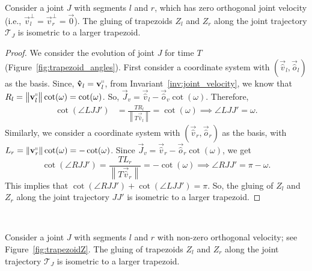 \begin{lemma}
\label{lem:trapezoid_gluing_parallel}
Consider a joint $J$ with segments $l$ and $r$,
which has zero orthogonal joint velocity (i.e., $\vec v_l^\perp = \vec v_r^\perp = \vec 0$).
The gluing of trapezoids $Z_l$ and $Z_r$ along the joint trajectory $\mathcal T_J$ is isometric to a larger trapezoid.
\end{lemma}
\begin{proof}
We consider the evolution of joint $J$ for time $T$ (Figure~\ref{fig:trapezoid_angles}).
First consider a coordinate system with $(\vec{\hat v}_l, \vec{\hat o}_l)$ as the basis.
Since, $\vec{\hat v}_l = \vec v_l^\shortparallel$, from Invariant~\ref{inv:joint_velocity},
we know that $R_l = \left\| \vec v_l^\shortparallel\right\|\cot(\omega) = \cot(\omega)$.
So, $\vec J_v = \vec{\hat v}_l - \vec{\hat o}_v\cot(\omega)$.  Therefore,
\begin{align*}
    \cot(\angle LJJ') &= \frac{T R_l}{ \left\| T\vec{\hat v}_l\right\|} = \cot(\omega)
    \implies \angle LJJ' = \omega.
\end{align*}
Similarly, we consider a coordinate system with $(\vec{\hat v}_r, \vec{\hat
o}_r)$ as the basis, with $L_r = \left\| \vec v_r^\shortparallel\right\|\cot(\omega) = - \cot(\omega)$.
Since $\vec J_v = \vec{\hat v}_r - \vec{\hat o}_r \cot(\omega)$, we get
$$
\cot(\angle RJJ') = \frac{T L_r}{ \left\| T\vec{\hat v}_r\right\|} = -\cot(\omega)
\implies \angle RJJ' = \pi - \omega.
$$
This implies that $\cot(\angle RJJ') + \cot(\angle LJJ') = \pi$.
So, the gluing of $Z_l$ and $Z_r$ along the joint trajectory $JJ'$ is isometric to a larger trapezoid.
\end{proof}



~
\vspace*{-4ex}

\begin{lemma}
\label{lem:trapezoid_gluing}
Consider a joint $J$ with segments $l$ and $r$ with non-zero orthogonal velocity; see Figure~\ref{fig:trapezoidZ}.
The gluing of trapezoids $Z_l$ and $Z_r$ along the joint trajectory $\mathcal T_J$ is isometric to a larger trapezoid.
\end{lemma}

